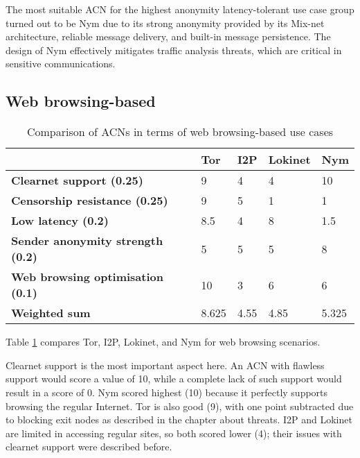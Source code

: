 The most suitable ACN for the highest anonymity latency-tolerant use case group turned out to be Nym due to its strong anonymity provided by its Mix-net architecture, reliable message delivery, and built-in message persistence. The design of Nym effectively mitigates traffic analysis threats, which are critical in sensitive communications.

\subsection{Web browsing-based}

\begin{table}[!ht]
\caption{Comparison of ACNs in terms of web browsing-based use cases}
\label{tab:web_browsing_uc}
\small
\begin{tabular}{|p{}|p{}|p{}|p{}|p{}|}
\hline
\textbf{} & \textbf{Tor} & \textbf{I2P} & \textbf{Lokinet} & \textbf{Nym} \\
\hline
\textbf{Clearnet support (0.25)} & 9 & 4 & 4 & 10 \\
\hline
\textbf{Censorship resistance (0.25)} & 9 & 5 & 1 & 1 \\
\hline
\textbf{Low latency (0.2)} & 8.5 & 4 & 8 & 1.5 \\
\hline
\textbf{Sender anonymity strength (0.2)} & 5 & 5 & 5 & 8 \\
\hline
\textbf{Web browsing optimisation (0.1)} & 10 & 3 & 6 & 6 \\
\hline
\textbf{Weighted sum} & 8.625 & 4.55 & 4.85 & 5.325 \\
\hline
\end{tabular}
\end{table}

Table \ref{tab:web_browsing_uc} compares Tor, I2P, Lokinet, and Nym for web browsing scenarios.

Clearnet support is the most important aspect here. An ACN with flawless support would score a value of 10, while a complete lack of such support would result in a score of 0. Nym scored highest (10) because it perfectly supports browsing the regular Internet. Tor is also good (9), with one point subtracted due to blocking exit nodes as described in the chapter about threats. I2P and Lokinet are limited in accessing regular sites, so both scored lower (4); their issues with clearnet support were described before.

